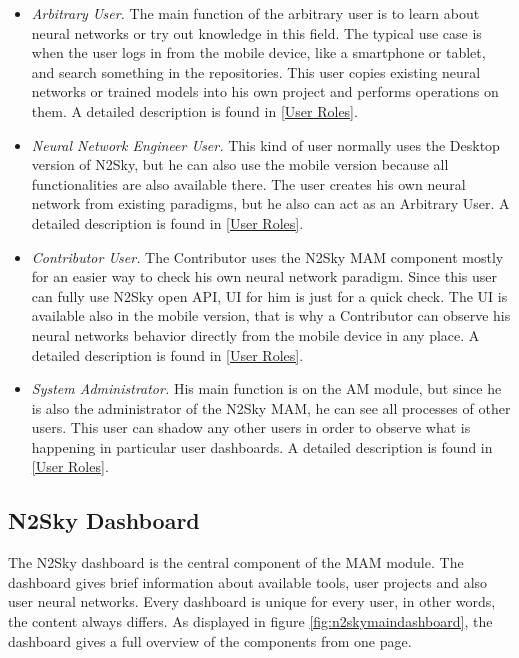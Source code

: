 \begin{itemize}
\item \emph{Arbitrary User.} The main function of the arbitrary user is to learn about neural networks or try out knowledge in this field. The typical use case is when the user logs in from the mobile device, like a smartphone or tablet, and search something in the repositories. This user copies existing neural networks or trained models into his own project and performs operations on them.  A detailed description is found in \autoref{User Roles}. 
\item \emph{Neural Network Engineer User.} This kind of user normally uses the Desktop version of N2Sky, but he can also use the mobile version because all functionalities are also available there. The user creates his own neural network from existing paradigms, but he also can act as an Arbitrary User.  A detailed description is found in \autoref{User Roles}. 
\item \emph{Contributor User.} The Contributor uses the N2Sky MAM component mostly for an easier way to check his own neural network paradigm. Since this user can fully use N2Sky open API, UI for him is just for a quick check. The UI is available also in the mobile version, that is why a Contributor can observe his neural networks behavior directly from the mobile device in any place. A detailed description is found in \autoref{User Roles}. 
\item \emph{System Administrator.} His main function is on the AM module, but since he is also the administrator of the N2Sky MAM, he can see all processes of other users. This user can shadow any other users in order to observe what is happening in particular user dashboards.  A detailed description is found in \autoref{User Roles}. 
\end{itemize}

\subsection{N2Sky Dashboard}\label{N2Sky Dashboard}
The N2Sky dashboard is the central component of the MAM module. The dashboard gives brief information about available tools, user projects and also user neural networks. Every dashboard is unique for every user, in other words, the content always differs. As displayed in figure \ref{fig:n2skymaindashboard}, the dashboard gives a full overview of the components from one page.

